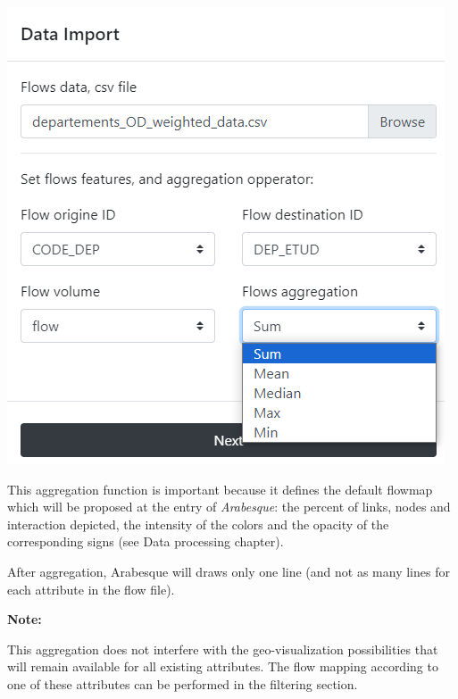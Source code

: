 \documentclass[
  letterpaper,
  DIV=11,
  numbers=noendperiod]{scrreprt}
\begin{document}
\begin{center}
\includegraphics{images/Flowdata_import_aggregation.png}
\end{center}

This aggregation function is important because it defines the default
flowmap which will be proposed at the entry of \emph{Arabesque}: the
percent of links, nodes and interaction depicted, the intensity of the
colors and the opacity of the corresponding signs (see Data processing
chapter).

After aggregation, Arabesque will draws only one line (and not as many
lines for each attribute in the flow file).

\begin{tcolorbox}[enhanced jigsaw, rightrule=.15mm, bottomrule=.15mm, colback=white, breakable, opacityback=0, colframe=quarto-callout-note-color-frame, toprule=.15mm, leftrule=.75mm, arc=.35mm, left=2mm]
\begin{minipage}[t]{5.5mm}
\textcolor{quarto-callout-note-color}{\faInfo}
\end{minipage}%
\begin{minipage}[t]{\textwidth - 5.5mm}

\vspace{-3mm}\textbf{Note:}\vspace{3mm}

This aggregation does not interfere with the geo-visualization
possibilities that will remain available for all existing attributes.
The flow mapping according to one of these attributes can be performed
in the filtering section.

\end{minipage}%
\end{tcolorbox}
\end{document}
